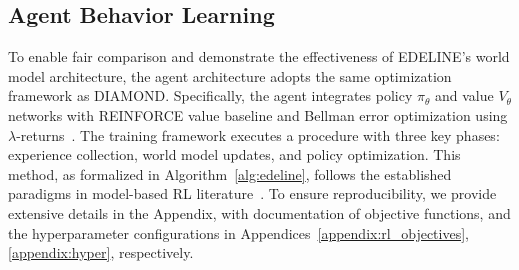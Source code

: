 \subsection{Agent Behavior Learning}
To enable fair comparison and demonstrate the effectiveness of EDELINE's world model architecture, the agent architecture adopts the same optimization framework as DIAMOND. Specifically, the agent integrates policy $\pi_\theta$ and value $V_\theta$ networks with REINFORCE value baseline and Bellman error optimization using $\lambda$-returns~\cite{alonso2024diamond}. The training framework executes a procedure with three key phases: experience collection, world model updates, and policy optimization. This method, as formalized in Algorithm~\ref{alg:edeline}, follows the established paradigms in model-based RL literature~\cite{Kaiser2020SimPLe,Hafner2020Dreamer,micheli2023iris,alonso2024diamond}. To ensure reproducibility, we provide extensive details in the Appendix, with documentation of objective functions, and the hyperparameter configurations in Appendices~\ref{appendix:rl_objectives}, \ref{appendix:hyper}, respectively. \vspace{-2em}
